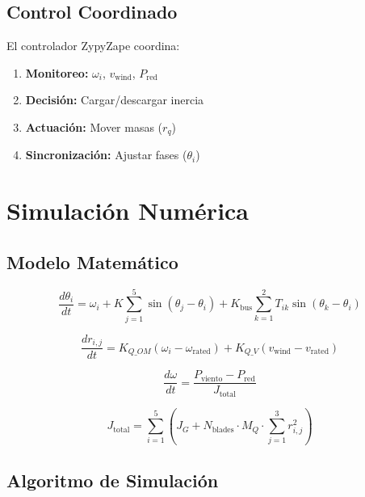\documentclass[12pt,a4paper]{article}
\newcommand{\deriv}[2]{\frac{d#1}{d#2}}
\begin{document}
\subsection{Control Coordinado}

El controlador ZypyZape coordina:

\begin{enumerate}
    \item \textbf{Monitoreo:} $\omega_i$, $v_{\text{wind}}$, $P_{\text{red}}$
    \item \textbf{Decisión:} Cargar/descargar inercia
    \item \textbf{Actuación:} Mover masas ($r_q$)
    \item \textbf{Sincronización:} Ajustar fases ($\theta_i$)
\end{enumerate}

\section{Simulación Numérica}

\subsection{Modelo Matemático}

\begin{equation}
\deriv{\theta_i}{t} = \omega_i + K \sum_{j=1}^{5} \sin(\theta_j - \theta_i) + K_{\text{bus}} \sum_{k=1}^{2} T_{ik} \sin(\theta_k - \theta_i)
\end{equation}

\begin{equation}
\deriv{r_{i,j}}{t} = K_{Q\_OM} (\omega_i - \omega_{\text{rated}}) + K_{Q\_V} (v_{\text{wind}} - v_{\text{rated}})
\end{equation}

\begin{equation}
\deriv{\omega}{t} = \frac{P_{\text{viento}} - P_{\text{red}}}{J_{\text{total}}}
\end{equation}

\begin{equation}
J_{\text{total}} = \sum_{i=1}^{5} \left( J_G + N_{\text{blades}} \cdot M_Q \cdot \sum_{j=1}^{3} r_{i,j}^2 \right)
\end{equation}

\subsection{Algoritmo de Simulación}
\end{document}
